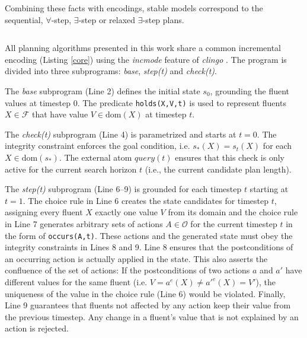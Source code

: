 \documentclass[
     11pt,                    %
     a4paper,             %
     BCOR=10mm,     %
     DIV=14,                 %
     listof=totoc,                    %
     bibliography=totoc,       %
     index=totoc,              %
     parskip            %
     twoside,
     headsepline
     ]{scrreprt}
\theoremstyle{definition}
\theoremstyle{definition}
\theoremstyle{remark}
\theoremstyle{bfnote}
\newcommand{\dom}{\mathrm{dom}}
\begin{document}
\begin{listing}[H]
  \caption{ASP Fact Representation of the Example Planning Task}
  \inputminted[frame=single,framesep=2mm,baselinestretch=1.2,linenos]{prolog}{encodings/example.lp}
  \label{example}
\end{listing}

Combining these facts with encodings, stable models correspond to the sequential, $\forall$-step, $\exists$-step or relaxed $\exists$-step plans.

\begin{listing}[H]
  \caption{Core of Sequential and Parallel Encodings}
  \inputminted[frame=single,framesep=2mm,baselinestretch=1.2,linenos,lastline=9]{prolog}{encodings/EX_common.lp}
  \label{core}
\end{listing}
All planning algorithms presented in this work share a common incremental encoding (Listing \ref{core}) using the \textit{incmode} feature of \textit{clingo} \parencite{clingo14}.
The program is divided into three subprograms: \textit{base}, \textit{step(t)} and \textit{check(t)}.

The \textit{base} subprogram (Line 2) defines the initial state $s_0$, grounding the fluent values at timestep $0$. The predicate \texttt{holds(X,V,t)} is used to represent fluents $X \in \mathcal{F}$ that have value $V\in \dom(X)$ at timestep $t$.

The \textit{check(t)} subprogram (Line 4) is parametrized and starts at $t=0$. The integrity constraint enforces the goal condition, i.e. $s_*(X)=s_t(X)$ for each $X\in \dom(s_*)$. The external atom $query(t)$ ensures that this check is only active for the current search horizon $t$ (i.e., the current candidate plan length).

The \textit{step(t)} subprogram (Line 6--9) is grounded for each timestep $t$ starting at $t=1$. 
The choice rule in Line 6 creates the state candidates for timestep $t$, assigning every fluent $X$ exactly one value $V$ from its domain and the choice rule in Line 7 generates arbitrary sets of actions $A \in \mathcal O$ for the current timestep $t$ in the form of \texttt{occurs(A,t)}. These actions and the generated state must obey the integrity constraints in Lines 8 and 9.
Line 8 ensures that the postconditions of an occurring action is actually applied in the state. This also asserts the confluence of the set of actions: If the postconditions of two actions $a$ and $a'$ have different values for the same fluent (i.e. $V = a^e(X) \ne a'^e(X) = V'$), the uniqueness of the value in the choice rule (Line 6) would be violated.
Finally, Line 9 guarantees that fluents not affected by any action keep their value from the previous timestep. Any change in a fluent's value that is not explained by an action is rejected.
\end{document}
